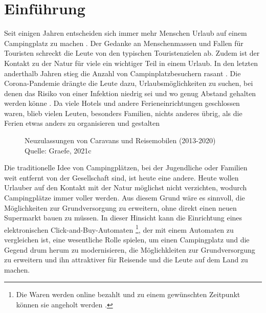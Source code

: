 \section{Einführung}


Seit einigen Jahren entscheiden sich immer mehr Menschen Urlaub auf einem Campingplatz zu machen 
\cite{periodical:ANST}. Der Gedanke an Menschenmassen und Fallen für Touristen schreckt die Leute von 
den typischen Touristenzielen ab. Zudem ist der Kontakt zu der Natur für viele ein wichtiger Teil 
in einem Urlaub. In den letzten anderthalb Jahren stieg die Anzahl von Campinplatzbesuchern rasant
\cite{periodical:UBST}. Die Corona-Pandemie drängte die Leute dazu, Urlaubsmöglichkeiten zu suchen, 
bei denen das Risiko von einer Infektion niedrig sei und wo genug Abstand gehalten werden könne
\cite{periodical:AUST}. Da viele Hotels und andere Ferieneinrichtungen geschlossen waren, blieb 
vielen Leuten, besonders Familien, nichts anderes übrig, als die Ferien etwas anders zu organisieren 
und gestalten 

\vfill
\begin{figure}[H]
    \caption{Neuzulassungen von Caravans und Reisemobilen (2013-2020) \\ Quelle: Graefe, 2021c}
    \label{fig:periodical_ANST}
\end{figure}

Die traditionelle Idee von Campingplätzen, bei der Jugendliche oder Familien weit entfernt von der 
Gesellschaft sind, ist heute eine andere. Heute wollen Urlauber auf den Kontakt mit der Natur
möglichst nicht verzichten, wodurch Campingplätze immer voller werden. Aus diesem Grund wäre es
sinnvoll, die Möglichkeiten zur Grundversorgung zu erweitern, ohne direkt einen neuen Supermarkt
bauen zu müssen. In dieser Hinsicht kann die Einrichtung eines elektronischen Click-and-Buy-Automaten
\footnote{Die Waren werden online bezahlt und zu einem gewünschten Zeitpunkt können sie angeholt
werden \cite{refart:ECPG}.}, der mit einem Automaten zu vergleichen ist, eine wesentliche Rolle 
spielen, um einen Campingplatz und die Gegend drum herum zu modernisieren, die Möglichkleiten 
zur Grundversorgung zu erweitern und ihn attraktiver für Reisende und die Leute auf dem Land zu machen.


